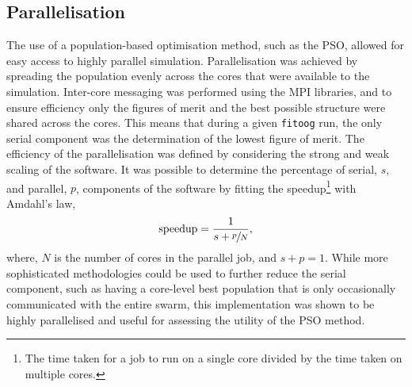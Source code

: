 \subsection{Parallelisation}
\label{sec:para}
The use of a population-based optimisation method, such as the PSO, allowed for easy access to highly parallel simulation.
Parallelisation was achieved by spreading the population evenly across the cores that were available to the simulation.
Inter-core messaging was performed using the MPI libraries, and to ensure efficiency only the figures of merit and the best possible structure were shared across the cores.
This means that during a given \texttt{fitoog} run, the only serial component was the determination of the lowest figure of merit.
The efficiency of the parallelisation was defined by considering the strong and weak scaling of the software.
It was possible to determine the percentage of serial, $s$, and parallel, $p$, components of the software by fitting the speedup\footnote{The time taken for a job to run on a single core divided by the time taken on multiple cores.} with Amdahl's law,\autocite{amdahl_validity_1967}
%
\begin{equation}
\text{speedup} = \frac{1}{s + \sfrac{p}{N}},
\end{equation}
%
where, $N$ is the number of cores in the parallel job, and $s + p = 1$.
While more sophisticated methodologies could be used to further reduce the serial component, such as having a core-level best population that is only occasionally communicated with the entire swarm, this implementation was shown to be highly parallelised and useful for assessing the utility of the PSO method.
